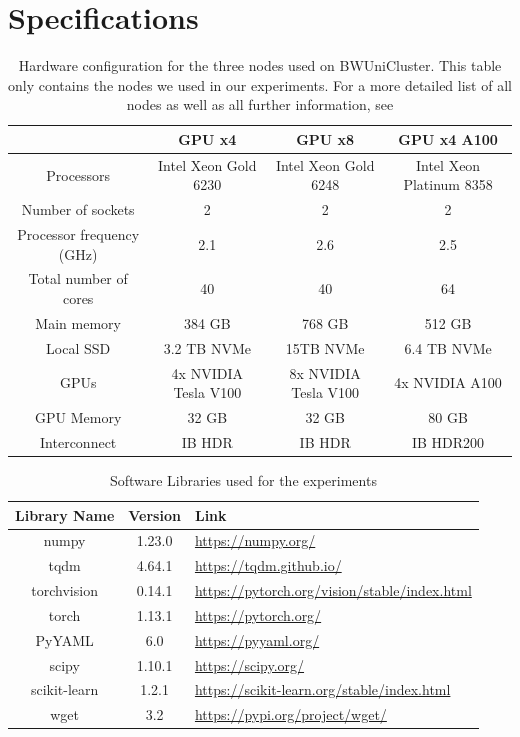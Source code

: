 \section{Specifications}
\label{sec:Appendix:Specifications}

\begin{table}[h!]
    \begin{tabular}{c | c c c} 
        \hline
         & GPU x4 & GPU x8 & GPU x4 A100 \\ 
        \hline 
        Processors & Intel Xeon Gold 6230 & Intel Xeon Gold 6248 & Intel Xeon Platinum 8358  \\ 
        Number of sockets & 2 & 2 & 2  \\ 
        Processor frequency (GHz) & 2.1 & 2.6 & 2.5  \\ 
        Total number of cores & 40 & 40 & 64  \\ 
        Main memory & 384 GB & 768 GB & 512 GB  \\ 
        Local SSD & 3.2 TB NVMe & 15TB NVMe & 6.4 TB NVMe  \\ 
        GPUs & 4x NVIDIA Tesla V100 & 8x NVIDIA Tesla V100 & 4x NVIDIA A100  \\ 
        GPU Memory & 32 GB  & 32 GB & 80 GB  \\ 
        Interconnect & IB HDR & IB HDR & IB HDR200  \\ 
        \hline
    \end{tabular}
    \caption{Hardware configuration for the three nodes used on BWUniCluster. This table only contains
    the nodes we used in our experiments. For a more detailed list of all nodes as well as all further
    information, see \cite{bwUniclusterHardware}}
    \label{fig:HardwareSpec}
\end{table}

\begin{table}[h!]
    \centering
    \begin{tabular}{c | c l } 
        \hline
        Library Name & Version & Link \\ 
        \hline 
        numpy & 1.23.0 & \url{https://numpy.org/} \\
        tqdm & 4.64.1 & \url{https://tqdm.github.io/}  \\
        torchvision & 0.14.1 & \url{https://pytorch.org/vision/stable/index.html} \\ 
        torch & 1.13.1 & \url{https://pytorch.org/} \\
        PyYAML & 6.0 & \url{https://pyyaml.org/} \\
        scipy & 1.10.1 & \url{https://scipy.org/} \\
        scikit-learn & 1.2.1 & \url{https://scikit-learn.org/stable/index.html} \\
        wget & 3.2 & \url{https://pypi.org/project/wget/} \\
        \hline
    \end{tabular}
    \caption{Software Libraries used for the experiments}
    \label{fig:Libraries}
\end{table}

